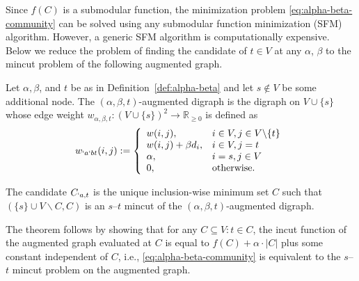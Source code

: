Since $f(C)$ is a submodular function, the minimization problem \eqref{eq:alpha-beta-community} can
be solved using any submodular function minimization (SFM) algorithm. However, a generic SFM
algorithm is computationally expensive. Below we reduce the problem of finding the
candidate of $t\in V$ at any $\alpha$, $\beta$ to the  mincut problem of the following augmented graph.

\begin{definition}
	\label{def:augmented}
	Let $\alpha, \beta$, and $t$ be as in Definition~\ref{def:alpha-beta} and let $s \notin V$ be
	some additional node.
	The
	$(\alpha,\beta,t)$-augmented digraph is the digraph on $V \cup \{s\}$  whose edge weight $w_{\alpha,\beta,t}: (V\cup \{s\})^{2} \rightarrow
	\mathbb{R}_{\geq 0}$ is defined as
	\begin{align}
		w_{`a`b t}(i,j):= \left\{
			\begin{array}{ll}
				w(i,j), & i\in V, j\in V\backslash \{t\} \\
				w(i,j) + \beta d_{i}, & i\in V, j = t  \\
				\alpha, & i = s, j \in V \\
				0, & \text{otherwise}.
			\end{array}
			\right .
	\end{align}
\end{definition}

\begin{theorem}
  \label{thm:mc}
	The candidate $C_{`a,t}$ is the unique inclusion-wise minimum set $C$ such that $(\{s\}\cup
	V\backslash C, C)$ is an $s$--$t$ mincut of the $(\alpha,\beta,t)$-augmented digraph.
\end{theorem}

\begin{Proof}[Sketch]
  The theorem follows by showing that for any $C\subseteq V:t\in C$, the incut function of the
  augmented graph evaluated at $C$ is equal to
  $f(C) + \alpha \! \cdot \! |C|$ plus some constant independent of $C$, i.e., \eqref{eq:alpha-beta-community} is
  equivalent to the $s$--$t$ mincut
  problem on the augmented graph.
\end{Proof}


